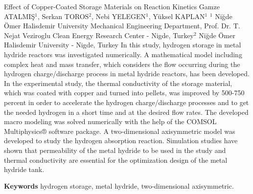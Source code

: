 
    \begin{abstract_online}{Effect of Copper-Coated Storage Materials on Reaction Kinetics}{%
        Gamze ATALMIŞ$^{1}$, Serkan TOROS$^{2}$, Nebi YELEGEN$^{1}$, Yüksel KAPLAN$^{1}$}{%
        }{%
        $^1$ Niğde Ömer Halisdemir University Mechanical Engineering Department, Prof. Dr. T. Nejat Veziroglu Clean Energy Research Center - Nigde, Turkey\newline{}$^2$ Niğde Ömer Halisdemir University - Nigde, Turkey}
    In this study, hydrogen storage in metal hydride reactors was investigated numerically. A mathematical model including complex heat and mass transfer, which considers the flow occurring during the hydrogen charge/discharge process in metal hydride reactors, has been developed. In the experimental study, the thermal conductivity of the storage material, which was coated with copper and turned into pellets, was improved by 500-750 percent in order to accelerate the hydrogen charge/discharge processes and to get the needed hydrogen in a short time and at the desired flow rates. The developed macro modeling was solved numerically with the help of the COMSOL Multiphysics® software package. A two-dimensional axisymmetric model was developed to study the hydrogen absorption reaction. Simulation studies have shown that permeability of the metal hydride to be used in the study and thermal conductivity are essential for the optimization design of the metal hydride tank. 
    
        \textbf{Keywords} \newline{}hydrogen storage, metal hydride, two-dimensional axisymmetric.
    \end{abstract_online}
    